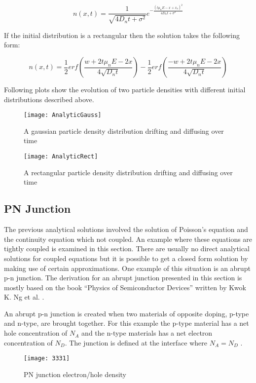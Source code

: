 \begin{doublespace}
\begin{equation}
n(x,t)=\frac{1}{\sqrt{4D_nt+\sigma^{2}}}e^{-\frac{(t\mu_n E-x+x_o)^2}{4D_n t+\sigma^2}}
\end{equation}

If the initial distribution is a rectangular then the solution takes the following form:

\begin{equation}
n(x,t)=\frac{1}{2} erf(\frac{w+2t \mu_n E-2x}{4\sqrt{D_n t}})-\frac{1}{2}erf(\frac{-w+2t \mu_n E-2x}{4\sqrt{D_n t}}) 
\end{equation}

Following plots show the evolution of two particle densities with  different initial distributions described above.

\begin{figure}[!htp]
\centering
\texttt{[image: AnalyticGauss]}
\caption{A gaussian particle density distribution drifting and diffusing over time} 
\end{figure}

\begin{figure}[!htp]
\centering
\texttt{[image: AnalyticRect]}
\caption{A rectangular particle density distribution drifting and diffusing over time} 
\end{figure}
\clearpage
\subsection{PN Junction}
The previous analytical solutions involved the solution of Poisson's equation and the continuity equation which  not coupled. An example where these equations are tightly coupled is examined in this section. There are usually no direct analytical solutions for coupled equations but it is possible to get a closed form solution by making use of certain approximations. One example of this situation is an abrupt p-n junction. The derivation for an abrupt junction presented in this section is mostly based on the book ``Physics of Semiconductor Devices'' written by Kwok K. Ng et al. \cite{Physem}. 

An abrupt p-n junction is created when two materials of opposite doping, p-type and n-type, are brought together. For this example the p-type material has a net hole concentration of $N_{A}$ and the n-type materials has a net electron concentration of $N_{D}$. The junction is defined at the interface where $N_A=N_D$ \cite{Physem}. 

\begin{figure}[!htp]
\centering
\texttt{[image: 3331]}
\caption{PN junction electron/hole density} 
\end{figure}


\end{doublespace}
